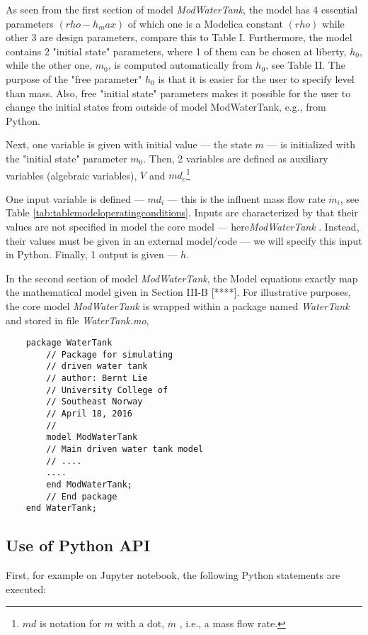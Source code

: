 As seen from the first section of model \textit{ModWaterTank}, the model has 4 essential parameters
$(rho-h_max)$ of which one is a Modelica constant $(rho)$ while other 3 are design parameters, compare this
to Table I. Furthermore, the model contains 2 "initial state" parameters, where 1 of them can be chosen at
liberty, $h_0$, while the other one, $m_0$, is computed automatically from $h_0$, see Table II. The purpose of
the "free parameter" $h_0$ is that it is easier for the user to specify level than mass. Also, free "initial state"
parameters makes it possible for the user to change the initial states from outside of model ModWaterTank, e.g., from Python.

Next, one variable is given with initial value — the state $m$ — is initialized with the "initial state" parameter
$m_0$. Then, 2 variables are defined as auxiliary variables (algebraic variables), $V$ and $md_e$\footnote{$md$ is notation for $m$ with a dot, $\dot{m}$ , i.e., a mass flow rate.}

One input variable is defined — $md_i$ — this is the influent mass flow rate $\dot{m}_i$, see Table \ref{tab:tablemodeloperatingconditions}. Inputs are
characterized by that their values are not specified in model the core model — here\textit{ModWaterTank} . Instead,
their values must be given in an external model/code — we will specify this input in Python. Finally, 1 output is
given — $h$.

In the second section of model \textit{ModWaterTank}, the Model equations exactly map the mathematical model
given in Section III-B [****]. For illustrative purposes, the core model \textit{ModWaterTank} is wrapped within a package named
\textit{WaterTank} and stored in file \textit{WaterTank.mo},


\begin{lstlisting}
	package WaterTank
		// Package for simulating
		// driven water tank
		// author: Bernt Lie
		// University College of
		// Southeast Norway
		// April 18, 2016
		//
		model ModWaterTank
		// Main driven water tank model
		// ....
		....
		end ModWaterTank;
		// End package
	end WaterTank;
\end{lstlisting}

\subsection{Use of Python API}
\label{subsec:pythonuseapi}

First, for example on Jupyter notebook, the following Python statements are executed:

